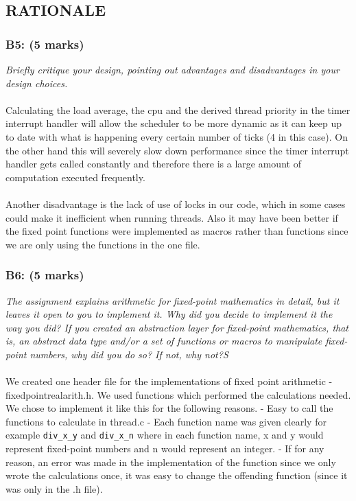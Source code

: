 \documentclass{article}
\begin{document}
\subsection{RATIONALE}

\subsubsection*{B5: (5 marks) }
\textit{Briefly critique your design, pointing out advantages and disadvantages in your design choices.}
\\ \\
 Calculating the load average, the cpu and the derived thread priority in the
  timer interrupt handler will allow the scheduler to be more dynamic as it can
  keep up to date with what is happening every certain number of ticks (4 in this case).
  On the other hand this will severely slow down performance since the timer interrupt
  handler gets called constantly and therefore there is a large amount of computation
  executed frequently.
\\ \\
Another disadvantage is the lack of use of locks in our code, which in some cases could make it inefficient when running threads. Also it may have been better if the fixed point functions were implemented as macros rather than functions since we are only using the functions in the one file.


\subsubsection*{B6: (5 marks) }
\textit{The assignment explains arithmetic for fixed-point mathematics in detail, but it leaves it open to you to implement it.  Why did you decide to implement it the way you did?  If you created an abstraction layer for fixed-point mathematics, that is, an abstract data type and/or a set of functions or macros to manipulate fixed-point numbers, why did you do so?  If not, why not?S}
\\ \\
We created one header file for the implementations of fixed point arithmetic
  - fixedpointrealarith.h. We used functions which performed the calculations
  needed. We chose to implement it like this for the following reasons.
    - Easy to call the functions to calculate in thread.c
	- Each function name was given clearly for example \texttt{div\_x\_y} and \texttt{div\_x\_n}
	  where in each function name, x and y would represent fixed-point numbers
	  and n would represent an integer.
	- If for any reason, an error was made in the implementation of the function
      since we only wrote the calculations once, it was easy to change the offending
      function (since it was only in the .h file).
\end{document}

